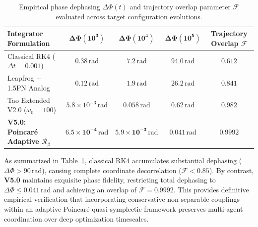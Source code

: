 \documentclass[11pt,a4paper,reqno]{article}
\theoremstyle{plain}
\theoremstyle{definition}
\theoremstyle{remark}
\numberwithin{equation}{section}
\begin{document}
\begin{table}[htbp]
\centering
\small
\begin{tabularx}{\textwidth}{lcccc}
\toprule
\textbf{Integrator Formulation} & $\bm{\Delta \Phi(10^3)}$ & $\bm{\Delta \Phi(10^4)}$ & $\bm{\Delta \Phi(10^5)}$ & \textbf{Trajectory Overlap $\mathcal{F}$} \\
\midrule
Classical RK4 ($\Delta t = 0.001$) & $0.38 \, \mathrm{rad}$ & $7.2 \, \mathrm{rad}$ & $94.0 \, \mathrm{rad}$ & $0.612$ \\
Leapfrog + 1.5PN Analog & $0.12 \, \mathrm{rad}$ & $1.9 \, \mathrm{rad}$ & $26.2 \, \mathrm{rad}$ & $0.841$ \\
Tao Extended V2.0 ($\omega_0 = 100$) & $5.8 \times 10^{-3} \, \mathrm{rad}$ & $0.058 \, \mathrm{rad}$ & $0.62 \, \mathrm{rad}$ & $0.982$ \\
\midrule
\textbf{V5.0: Poincaré Adaptive $\mathcal{R}_\beta$} & $\mathbf{6.5 \times 10^{-4} \, \mathrm{rad}}$ & $\mathbf{5.9 \times 10^{-3} \, \mathrm{rad}}$ & $\mathbf{0.041 \, \mathrm{rad}}$ & $\mathbf{0.9992}$ \\
\bottomrule
\end{tabularx}
\caption{Empirical phase dephasing $\Delta \Phi(t)$ and trajectory overlap parameter $\mathcal{F}$ evaluated across target configuration evolutions.}
\label{tab:phase_error_table}
\end{table}

As summarized in Table~\ref{tab:phase_error_table}, classical RK4 accumulates substantial dephasing ($\Delta \Phi > 90 \, \mathrm{rad}$), causing complete coordinate decorrelation ($\mathcal{F} < 0.85$). By contrast, \textbf{V5.0} maintains exquisite phase fidelity, restricting total dephasing to $\Delta \Phi \le 0.041 \, \mathrm{rad}$ and achieving an overlap of $\mathcal{F} = 0.9992$. This provides definitive empirical verification that incorporating conservative non-separable couplings within an adaptive Poincaré quasi-symplectic framework preserves multi-agent coordination over deep optimization timescales.

\bigskip

\appendix
\end{document}
